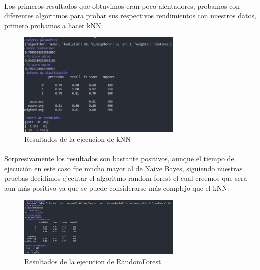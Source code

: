 \documentclass{report}
\begin{document}
{{                \paragraph*{}{
                Los primeros resultados que obtuvimos eran poco alentadores, probamos con diferentes algoritmos para probar sus respectivos rendimientos con nuestros datos, primero probamos a hacer kNN:
                }
                \begin{figure}[H]
                    \centering
                    \includegraphics[width=0.7\textwidth]{img/kNNSMOTE.png}
                    \caption{Resultados de la ejecucion de kNN}
                \end{figure}
                \paragraph*{}{
                   Sorpresivamente los resultados son bastante positivos, aunque el tiempo de ejecución en este caso fue mucho mayor al de Naive Bayes, siguiendo nuestras pruebas decidimos ejecutar el algoritmo random forest el cual creemos que sera aun más positivo ya que se puede considerarse más complejo que el kNN:
                }
                \begin{figure}[H]
                    \centering
                    \includegraphics[width=0.7\textwidth]{img/randomForestSMOTE.png}
                    \caption{Resultados de la ejecucion de RandomForest}
                \end{figure}
}}
\end{document}
